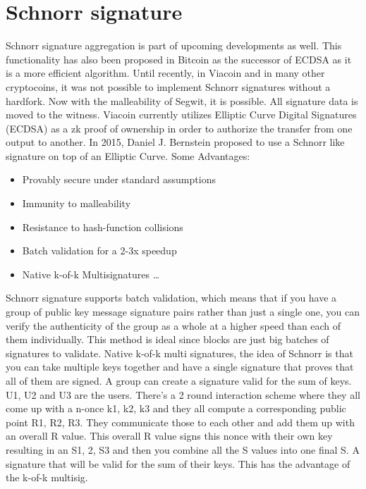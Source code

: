\documentclass{article}
\begin{document}
\section{Schnorr signature}\label{sec: Schnorr signature}
Schnorr signature aggregation is part of upcoming developments as well. This functionality has also been proposed in Bitcoin
as the successor of ECDSA as it is a more efficient algorithm. Until recently, in Viacoin and in many other cryptocoins, it
was not possible to implement Schnorr signatures without a hardfork. Now with the malleability of Segwit, it is possible.
All signature data is moved to the witness.
Viacoin currently utilizes Elliptic Curve Digital Signatures (ECDSA) as a zk proof of
ownership in order to authorize the transfer from one output to another. In 2015,
Daniel J. Bernstein proposed to use a Schnorr like signature on top of an Elliptic Curve.
\newline \newline
Some Advantages:
\begin{itemize}
\item Provably secure under standard assumptions
\item Immunity to malleability
\item Resistance to hash-function collisions
\item Batch validation for a 2-3x speedup
\item Native k-of-k Multisignatures \ldots
\end{itemize}
\noindent
Schnorr signature supports batch validation, which means that if you have a group of public key
message signature pairs rather than just a single one, you can verify the authenticity of the group as a whole
at a higher speed than each of them individually. This method is ideal since blocks are just big batches of signatures to
validate.
\linebreak \noindent
Native k-of-k multi signatures, the idea of Schnorr is that you can take multiple keys
together and have a single signature that proves that all of them are signed.
A group can create a signature valid for the sum of keys.
U1, U2 and U3 are the users. There’s a 2 round interaction scheme where they all
come up with a n-once k1, k2, k3 and they all compute a corresponding public
point R1, R2, R3. They communicate those to each other and add them up with
an overall R value. This overall R value signs this nonce with their own key
resulting in an S1, 2, S3 and then you combine all the S values into one final S. A
signature that will be valid for the sum of their keys. This has the advantage of
the k-of-k multisig.
\linebreak
\end{document}
